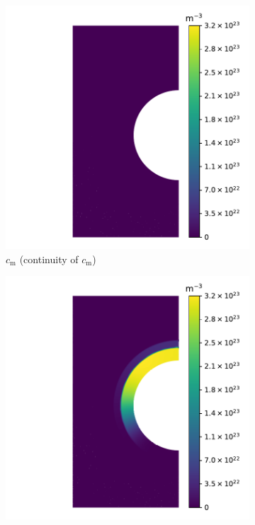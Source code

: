 \begin{figure}
    \centering
    \begin{subfigure}{0.5\linewidth}
        \centering
        \includegraphics[width=\linewidth]{Figures/Chapter3/monoblocks/interface_condition/iter case/mobile_concentration.pdf}
        \caption{$c_\mathrm{m}$ (continuity of $c_\mathrm{m}$)}
    \end{subfigure}%
    \begin{subfigure}{0.5\linewidth}
        \centering
        \includegraphics[width=\linewidth]{Figures/Chapter3/monoblocks/interface_condition/iter case/mobile_chemical_pot.pdf}

\end{subfigure}
\end{figure}
